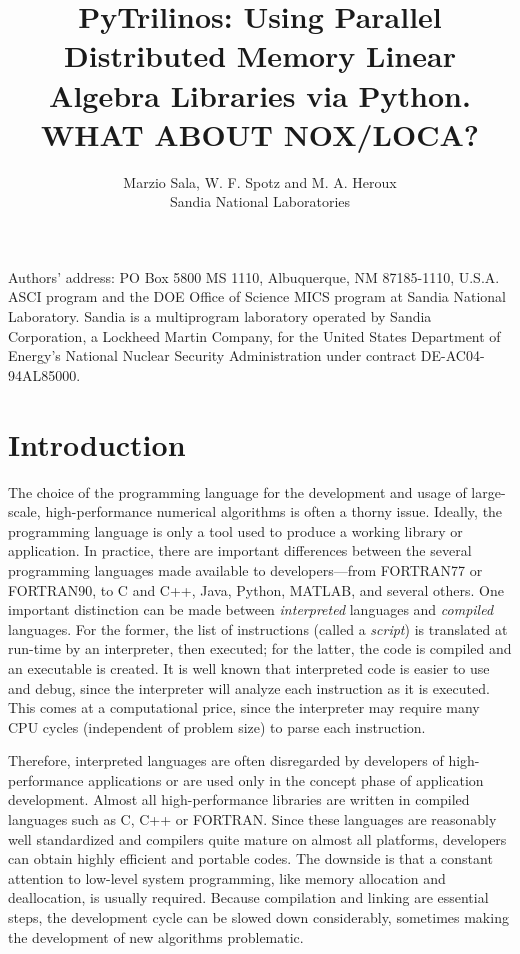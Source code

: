 \documentclass[acmtocl]{acmtrans2m}
\title{PyTrilinos: Using Parallel Distributed Memory Linear Algebra
  Libraries via Python. WHAT ABOUT NOX/LOCA?}
\author{Marzio Sala, W. F. Spotz and M. A. Heroux\\Sandia National
  Laboratories}
\begin{document}
\setcounter{page}{1}

\begin{bottomstuff}
Authors' address:
PO Box 5800 MS 1110, Albuquerque, NM 87185-1110, U.S.A.\newline
ASCI program and the DOE Office of Science MICS program at Sandia
  National Laboratory.  Sandia is a multiprogram laboratory operated by
  Sandia Corporation, a Lockheed Martin Company, for the United States
  Department of Energy's National Nuclear Security Administration under
  contract DE-AC04-94AL85000.
\end{bottomstuff}

\maketitle

\section{Introduction}
\label{sec:intro}

The choice of the programming language for the development and usage
of large-scale, high-performance numerical algorithms is often a
thorny issue. Ideally, the programming language is only a tool used to
produce a working library or application. In practice, there are
important differences between the several programming languages made
available to developers---from FORTRAN77 or FORTRAN90, to C and C++,
Java, Python, MATLAB, and several others. One important distinction
can be made between {\sl interpreted} languages and {\sl compiled}
languages. For the former, the list of instructions (called a {\sl
  script}) is translated at run-time by an interpreter, then executed;
for the latter, the code is compiled and an executable is created.  It
is well known that interpreted code is easier to use and debug, since
the interpreter will analyze each instruction as it is executed. This
comes at a computational price, since the interpreter may require many
CPU cycles (independent of problem size) to parse each instruction.

Therefore, interpreted languages are often disregarded by developers
of high-performance applications or are used only in the concept phase
of application development. Almost all high-performance libraries are
written in compiled languages such as C, C++ or FORTRAN. Since these
languages are reasonably well standardized and compilers quite mature
on almost all platforms, developers can obtain highly efficient and
portable codes.  The downside is that a constant attention to
low-level system programming, like memory allocation and deallocation,
is usually required. Because compilation and linking are essential
steps, the development cycle can be slowed down considerably,
sometimes making the development of new algorithms problematic.
\end{document}
